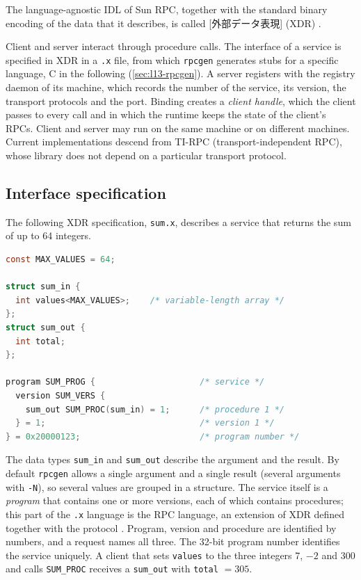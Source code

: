 \documentclass[../main.tex]{subfiles}
\begin{document}
\begin{definition}
  The language-agnostic IDL of Sun RPC, together with the standard binary
  encoding of the data that it describes, is called
  [外部データ表現] (XDR)
  \cite{rfc4506}.
\end{definition}

Client and server interact through procedure calls.  The interface of a
service is specified in XDR in a \texttt{.x} file, from which
\texttt{rpcgen} generates stubs for a specific language, C in the following
(\cref{sec:l13-rpcgen}).  A server registers with the registry daemon of its
machine, which records the number of the service, its version, the
transport protocols and the port.  Binding creates a \emph{client handle},
which the client passes to every call and in which the runtime keeps the
state of the client's RPCs.  Client and server may run on the same machine
or on different machines.  Current implementations descend from TI-RPC
(transport-independent RPC), whose library does not depend on a particular
transport protocol.

\subsection{Interface specification}

The following XDR specification, \texttt{sum.x}, describes a service that
returns the sum of up to 64 integers.

\begin{lstlisting}[language=C, numbers=none]
const MAX_VALUES = 64;

struct sum_in {
  int values<MAX_VALUES>;    /* variable-length array */
};
struct sum_out {
  int total;
};

program SUM_PROG {                     /* service */
  version SUM_VERS {
    sum_out SUM_PROC(sum_in) = 1;      /* procedure 1 */
  } = 1;                               /* version 1 */
} = 0x20000123;                        /* program number */
\end{lstlisting}

The data types \texttt{sum\_in} and \texttt{sum\_out} describe the argument
and the result.  By default \texttt{rpcgen} allows a single argument and a
single result (several arguments with \texttt{-N}), so several values are
grouped in a structure.  The service itself
is a \emph{program} that contains one or more versions, each of which
contains procedures; this part of the \texttt{.x} language is the RPC
language, an extension of XDR defined together with the protocol
\cite{rfc5531}.  Program, version and procedure are identified by numbers,
and a request names all three.  The 32-bit program number identifies the
service uniquely.  A client
that sets
\texttt{values} to the three integers 7, $-2$ and 300 and calls
\texttt{SUM\_PROC} receives a \texttt{sum\_out} with \texttt{total} $=305$.
\end{document}
